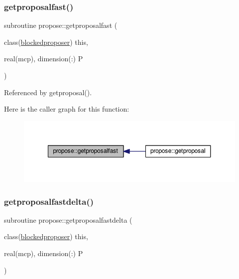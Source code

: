 \subsubsection{\texorpdfstring{getproposalfast()}{getproposalfast()}}
{\footnotesize\ttfamily subroutine propose\+::getproposalfast (\begin{DoxyParamCaption}\item[{class(\mbox{\hyperlink{structpropose_1_1blockedproposer}{blockedproposer}})}]{this,  }\item[{real(mcp), dimension(\+:)}]{P }\end{DoxyParamCaption})}



Referenced by getproposal().

Here is the caller graph for this function\+:
\nopagebreak
\begin{figure}[H]
\begin{center}
\leavevmode
\includegraphics[width=348pt]{namespacepropose_ac628bde62d39c32001cbd8b6a33fb2cc_icgraph}
\end{center}
\end{figure}
\mbox{\label{namespacepropose_a336c9a51cd0387485ce6184eb753c720}} 
\subsubsection{\texorpdfstring{getproposalfastdelta()}{getproposalfastdelta()}}
{\footnotesize\ttfamily subroutine propose\+::getproposalfastdelta (\begin{DoxyParamCaption}\item[{class(\mbox{\hyperlink{structpropose_1_1blockedproposer}{blockedproposer}})}]{this,  }\item[{real(mcp), dimension(\+:)}]{P }\end{DoxyParamCaption})}

\mbox{\label{namespacepropose_a593b61b41784923a7b85bc8a66c07ef8}} 
